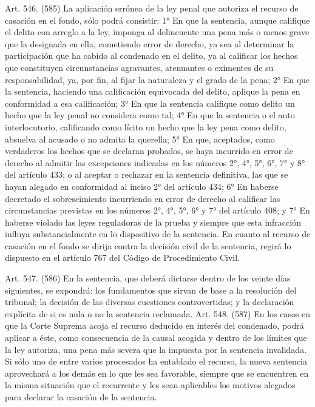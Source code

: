     Art. 546. (585) La aplicación errónea de la ley penal que autoriza el recurso de casación en el fondo, sólo podrá consistir:
    1° En que la sentencia, aunque califique el delito con arreglo a la ley, imponga al delincuente una pena más o menos grave que la designada en ella, cometiendo error de derecho, ya sea al determinar la participación que ha cabido al condenado en el delito, ya al calificar los hechos que constituyen circunstancias agravantes, atenuantes o eximentes de su responsabilidad, ya, por fin, al fijar la naturaleza y el grado de la pena;
    2° En que la sentencia, haciendo una calificación equivocada del delito, aplique la pena en conformidad a esa calificación;
    3° En que la sentencia califique como delito un hecho que la ley penal no considera como tal;
    4° En que la sentencia o el auto interlocutorio, calificando como lícito un hecho que la ley pena como delito, absuelva al acusado o no admita la querella;
    5° En que, aceptados, como verdaderos los hechos que se declaran probados, se haya incurrido en error de derecho al admitir las excepciones indicadas en los números 2°, 4°, 5°, 6°, 7° y 8° del artículo 433; o al aceptar o rechazar en la sentencia definitiva, las que se hayan alegado en conformidad al inciso 2° del artículo 434;
    6° En haberse decretado el sobreseimiento incurriendo en error de derecho al calificar las circunstancias previstas en los números 2°, 4°, 5°, 6° y 7° del artículo 408; y
    7° En haberse violado las leyes reguladoras de la prueba y siempre que esta infracción influya substancialmente en lo dispositivo de la sentencia.
    En cuanto al recurso de casación en el fondo se dirija contra la decisión civil de la sentencia, regirá lo dispuesto en el artículo 767 del Código de Procedimiento Civil.

    Art. 547. (586) En la sentencia, que deberá dictarse dentro de los veinte días siguientes, se expondrá: los fundamentos que sirvan de base a la resolución del tribunal; la decisión de las diversas cuestiones controvertidas; y la declaración explícita de si es nula o no la sentencia reclamada.
    Art. 548. (587) En los casos en que la Corte Suprema acoja el recurso deducido en interés del condenado, podrá aplicar a éste, como consecuencia de la causal acogida y dentro de los límites que la ley autoriza, una pena más severa que la impuesta por la sentencia invalidada.
    Si sólo uno de entre varios procesados ha entablado el recurso, la nueva sentencia aprovechará a los demás en lo que les sea favorable, siempre que se encuentren en la misma situación que el recurrente y les sean aplicables los motivos alegados para declarar la casación de la sentencia.


